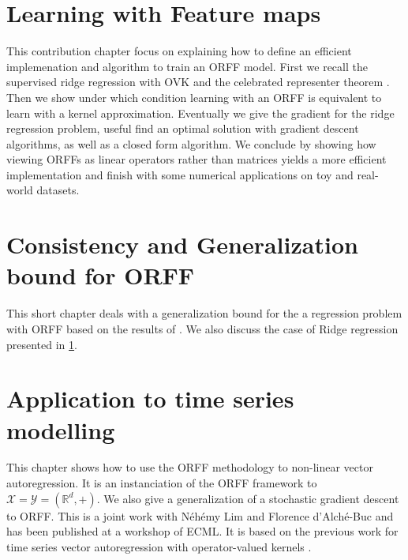 \chapter{Learning with Feature maps}
\label{ch:learning operator-valued_random_fourier_features}
\bigskip
\begin{justify}
    This contribution chapter focus on explaining how to define an efficient
    implemenation and algorithm to train an \acs{ORFF} model. First we recall
    the supervised ridge regression with \acs{OVK} and the celebrated
    representer theorem \citep{Wahba90}. Then we show under which condition
    learning with an \acs{ORFF} is equivalent to learn with a kernel
    approximation. Eventually we give the gradient for the ridge regression
    problem, useful find an optimal solution with gradient descent algorithms,
    as well as a closed form algorithm.  We conclude by showing how viewing
    \acsp{ORFF} as linear operators rather than matrices yields a more
    efficient implementation and finish with some numerical applications on toy
    and real-world datasets.
\end{justify}
\minitoc


\chapter{Consistency and Generalization bound for ORFF}
\label{ch:generalization_for_ORFF}
\bigskip
\begin{justify} 
    This short chapter deals with a generalization bound for the a regression
    problem with ORFF based on the results of \citet{rahimi2009weighted,
    maurer2016vector}. We also discuss the case of Ridge regression presented
    in \cref{ch:learning operator-valued_random_fourier_features}.
\end{justify}
\minitoc



\chapter{Application to time series modelling} %
\label{ch:applications}
\bigskip
\begin{justify}
    This chapter shows how to use the \acs{ORFF} methodology to non-linear
    vector autoregression. It is an instanciation of the \acs{ORFF} framework
    to $\mathcal{X}=\mathcal{Y}=(\mathbb{R}^d, +)$. We also give a
    generalization of a stochastic gradient descent \citep{dai2014scalable} to
    \acs{ORFF}. This is a joint work with N\'eh\'emy Lim and Florence
    d'Alch\'e-Buc and has been published at a workshop of \acs{ECML}. It is
    based on the previous work \citet{Lim2015} for time series vector
    autoregression with operator-valued kernels \cite{brault2016scaling}.
\end{justify}
\minitoc

